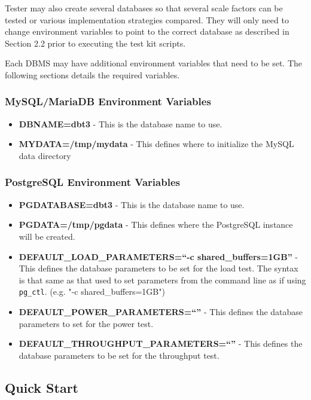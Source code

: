 \documentclass{article}
\begin{document}
Tester may also create several databases so that several scale factors can be
tested or various implementation strategies compared.  They will only need to
change environment variables to point to the correct database as described in
Section 2.2 prior to executing the test kit scripts.

Each DBMS may have additional environment variables that need to be set.  The
following sections details the required variables.

\subsubsection{MySQL/MariaDB Environment Variables}

\begin{itemize}
  \item \textbf{DBNAME=dbt3} - This is the database name to use.
  \item \textbf{MYDATA=/tmp/mydata} - This defines where to initialize the
        MySQL data directory
\end{itemize}

\subsubsection{PostgreSQL Environment Variables}

\begin{itemize}
  \item \textbf{PGDATABASE=dbt3} - This is the database name to use.
  \item \textbf{PGDATA=/tmp/pgdata} - This defines where the PostgreSQL
        instance will be created.
  \item \textbf{DEFAULT\_LOAD\_PARAMETERS=``-c shared\_buffers=1GB''} - This
        defines the database parameters to be set for the load test.  The
            syntax is that same as that used to set parameters from the command
                line as if using \texttt{pg\_ctl}. (e.g. "-c
                    shared\_buffers=1GB")
  \item \textbf{DEFAULT\_POWER\_PARAMETERS=``''} - This defines the database
        parameters to set for the power test.
  \item \textbf{DEFAULT\_THROUGHPUT\_PARAMETERS=``''} - This defines the
        database parameters to be set for the throughput test.
\end{itemize}

\subsection{Quick Start}
\end{document}
